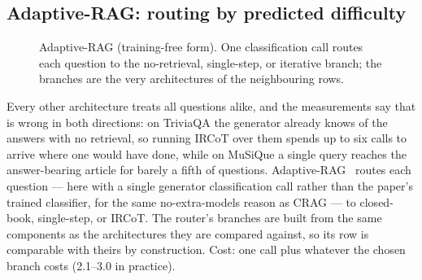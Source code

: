 \subsection{Adaptive-RAG: routing by predicted difficulty}
\label{sec:arch-adaptive}

\begin{figure}[t]
\centering
{}
\caption{Adaptive-RAG (training-free form). One classification call routes
each question to the no-retrieval, single-step, or iterative branch; the
branches are the very architectures of the neighbouring rows.}
\label{fig:arch-adaptive}
\end{figure}

Every other architecture treats all questions alike, and the measurements
say that is wrong in both directions: on TriviaQA the generator already
knows \ClosedBookTriviaQAEM{} of the answers with no retrieval, so running
IRCoT over them spends up to six calls to arrive where one would have
done, while on MuSiQue a single query reaches the answer-bearing article
for barely a fifth of questions. Adaptive-RAG~\cite{jeong2024adaptiverag}
routes each question --- here with a single generator classification call
rather than the paper's trained classifier, for the same
no-extra-models reason as CRAG --- to closed-book, single-step, or IRCoT.
The router's branches are built from the same components as the
architectures they are compared against, so its row is comparable with
theirs by construction. Cost: one call plus whatever the chosen branch
costs (2.1--3.0 in practice).
